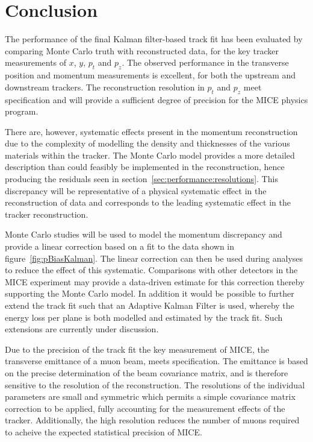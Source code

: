\section{Conclusion}
\label{sec:Conclusion}

The performance of the final Kalman filter-based track fit has been evaluated by comparing Monte Carlo truth with reconstructed data, for the key tracker measurements of $x$, $y$, $p_{t}$ and $p_z$.  The observed performance in the transverse position and momentum measurements is excellent, for both the upstream and downstream trackers. The reconstruction resolution in $p_t$ and $p_z$ meet specification and will provide a sufficient degree of precision for the MICE physics program.

There are, however, systematic effects present in the momentum reconstruction due to the complexity of modelling the density and thicknesses of the various materials within the tracker. The Monte Carlo model provides a more detailed description than could feasibly be implemented in the reconstruction, hence producing the residuals seen in section~\ref{sec:performance:resolutions}. This discrepancy will be representative of a physical systematic effect in the reconstruction of data and corresponds to the leading systematic effect in the tracker reconstruction.

Monte Carlo studies will be used to model the momentum discrepancy and provide a linear correction based on a fit to the data shown in figure~\ref{fig:pBiasKalman}. The linear correction can then be used during analyses to reduce the effect of this systematic. Comparisons with other detectors in the MICE experiment may provide a data-driven estimate for this correction thereby supporting the Monte Carlo model. In addition it would be possible to further extend the track fit such that an Adaptive Kalman Filter is used, whereby the energy loss per plane is both modelled and estimated by the track fit. Such extensions are currently under discussion.

Due to the precision of the track fit the key measurement of MICE, the transverse emittance of a muon beam, meets specification. The emittance is based on the precise determination of the beam covariance matrix, and is therefore sensitive to the resolution of the reconstruction. The resolutions of the individual parameters are small and symmetric which permits a simple covariance matrix correction to be applied, fully accounting for the measurement effects of the tracker. Additionally, the high resolution reduces the number of muons required to acheive the expected statistical precision of MICE.

